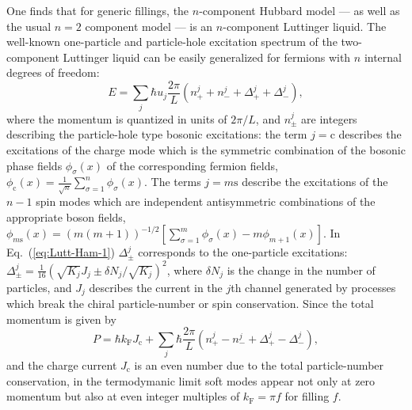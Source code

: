 \documentclass[aps,prb,twocolumn,floatfix,showpacs]{revtex4}
\begin{document}
One finds that
for generic fillings, the $n$-component Hubbard model --- as well as the usual
$n=2$ component model --- is an $n$-component Luttinger liquid. The well-known
one-particle and particle-hole excitation spectrum of the two-component
Luttinger liquid \cite{H} can be easily generalized for fermions with $n$
internal degrees of freedom:
\begin{equation}
\label{eq:Lutt-Ham-1}
E = \sum_j \hbar u_j \frac{2\pi}{L} \left( n_+^j + n_-^j + \Delta_+^j +
\Delta_-^j \right),
\end{equation}
where the momentum is quantized in units of $2\pi/L$, and $n_\pm ^j$ are
integers describing the particle-hole type bosonic excitations: the term
$j=\mathrm{c}$ describes the excitations of the charge mode which is the
symmetric combination of the bosonic phase fields $\phi_\sigma (x)$ of the
corresponding fermion fields, $\phi_{\mathrm{c}} (x) = \frac{1}{\sqrt{n}}
\sum_{\sigma=1}^n \phi_{\sigma}(x)$. The terms $j=m\mathrm{s}$ describe the
excitations of the $n-1$ spin modes which are independent antisymmetric
combinations of the appropriate boson fields, $\phi_{m\mathrm{s}}(x) =
(m(m+1))^{-1/2}\left[ \sum_{\sigma=1}^m \phi_{\sigma}(x) - m\phi_{m+1}(x)
\right]$. In Eq.~(\ref{eq:Lutt-Ham-1}) $\Delta_\pm^j$ corresponds to the
one-particle excitations: $\Delta_\pm^j = \frac{1}{16} ( \sqrt{K_j} J_j \pm
\delta N_j /\sqrt{K_j} )^2$, where $\delta N_j$ is the change in the number of
particles, and $J_j$ describes the current in the $j$th channel generated by
processes which break the chiral particle-number or spin conservation. Since
the total momentum is given by
\begin{equation}
P=\hbar k_{\mathrm{F}} J_{\mathrm{c}} + \sum_j \hbar \frac{2
\pi}{L}\left(n_+^j - n_-^j + \Delta_+^j - \Delta_-^j \right),
\end{equation}
and the charge current $J_{\mathrm{c}}$ is an even number due to the total
particle-number conservation, in the termodymanic limit soft modes appear not
only at zero momentum but also at even integer multiples of
$k_{\mathrm{F}}=\pi f$ for filling $f$.
\end{document}
